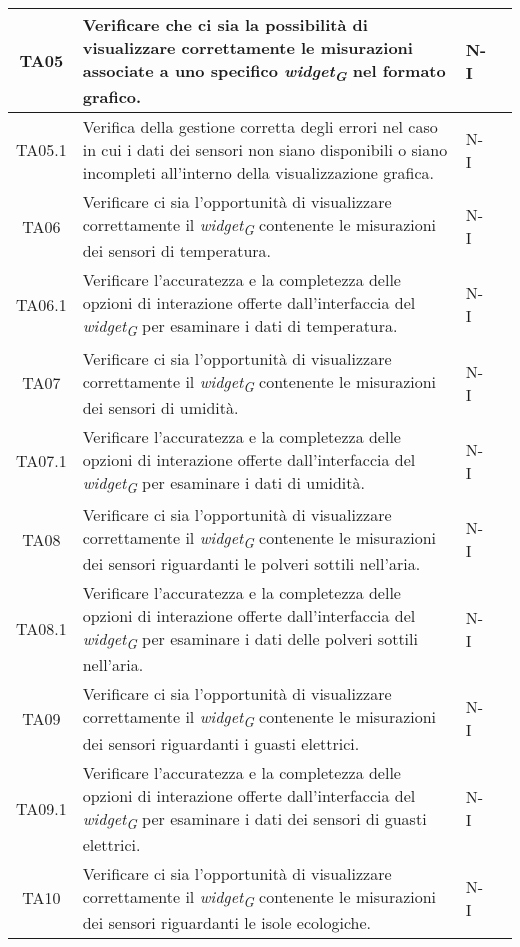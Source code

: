 \begin{longtable}{|c|p{5cm}|p{2cm}|c|}
    \hline
    TA05 & Verificare che ci sia la possibilità di visualizzare correttamente le misurazioni associate a uno specifico \textit{widget}\textsubscript{\textit{G}} nel formato grafico. & N-I \\
    \hline
    TA05.1 & Verifica della gestione corretta degli errori nel caso in cui i dati dei sensori non siano disponibili o siano incompleti all'interno della visualizzazione grafica. & N-I \\
    \hline
    TA06 & Verificare ci sia l'opportunità di visualizzare correttamente il \textit{widget}\textsubscript{\textit{G}} contenente le misurazioni dei sensori di temperatura. & N-I \\
    \hline
    TA06.1 & Verificare l'accuratezza e la completezza delle opzioni di interazione offerte dall'interfaccia del \textit{widget}\textsubscript{\textit{G}} per esaminare i dati di temperatura. & N-I \\
    \hline
    TA07 & Verificare ci sia l'opportunità di visualizzare correttamente il \textit{widget}\textsubscript{\textit{G}} contenente le misurazioni dei sensori di umidità. & N-I \\
    \hline
    TA07.1 & Verificare l'accuratezza e la completezza delle opzioni di interazione offerte dall'interfaccia del \textit{widget}\textsubscript{\textit{G}} per esaminare i dati di umidità. & N-I \\
    \hline
    TA08 & Verificare ci sia l'opportunità di visualizzare correttamente il \textit{widget}\textsubscript{\textit{G}} contenente le misurazioni dei sensori riguardanti le polveri sottili nell'aria. & N-I \\
    \hline
    TA08.1 & Verificare l'accuratezza e la completezza delle opzioni di interazione offerte dall'interfaccia del \textit{widget}\textsubscript{\textit{G}} per esaminare i dati delle polveri sottili nell'aria. & N-I \\
    \hline
    TA09 & Verificare ci sia l'opportunità di visualizzare correttamente il \textit{widget}\textsubscript{\textit{G}} contenente le misurazioni dei sensori riguardanti i guasti elettrici. & N-I \\
    \hline
    TA09.1 & Verificare l'accuratezza e la completezza delle opzioni di interazione offerte dall'interfaccia del \textit{widget}\textsubscript{\textit{G}} per esaminare i dati dei sensori di guasti elettrici. & N-I \\
    \hline
    TA10 & Verificare ci sia l'opportunità di visualizzare correttamente il \textit{widget}\textsubscript{\textit{G}} contenente le misurazioni dei sensori riguardanti le isole ecologiche. & N-I \\

\end{longtable}
